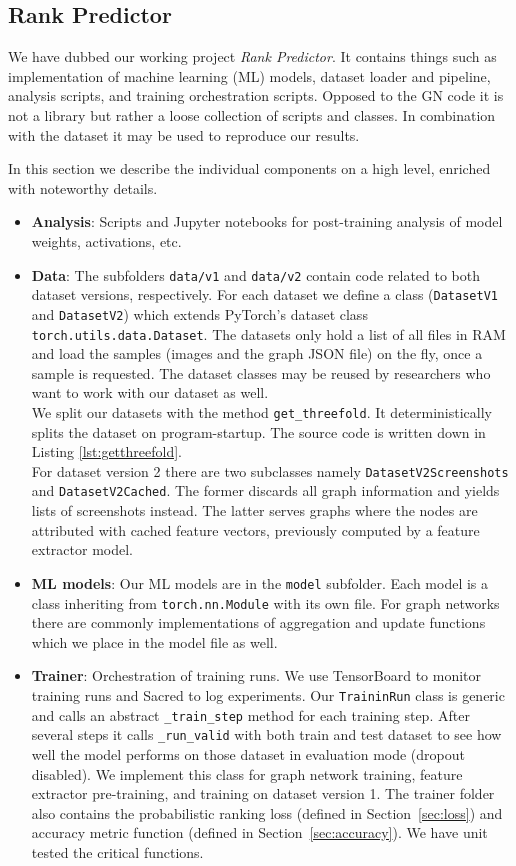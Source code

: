 \subsection{Rank Predictor}

We have dubbed our working project \textit{Rank Predictor}. It contains things such as implementation of machine learning (ML) models, dataset loader and pipeline, analysis scripts, and training orchestration scripts. Opposed to the GN code it is not a library but rather a loose collection of scripts and classes. In combination with the dataset it may be used to reproduce our results.

In this section we describe the individual components on a high level, enriched with noteworthy details.

\begin{itemize}
    \item \textbf{Analysis}: Scripts and Jupyter notebooks for post-training analysis of model weights, activations, etc.
    \item \textbf{Data}: The subfolders \texttt{data/v1} and \texttt{data/v2} contain code related to both dataset versions, respectively. For each dataset we define a class (\texttt{DatasetV1} and \texttt{DatasetV2}) which extends PyTorch's dataset class \texttt{torch.utils.data.Dataset}. The datasets only hold a list of all files in RAM and load the samples (images and the graph JSON file) on the fly, once a sample is requested. The dataset classes may be reused by researchers who want to work with our dataset as well.\\
    We split our datasets with the method \texttt{get\_threefold}. It deterministically splits the dataset on program-startup. The source code is written down in Listing \ref{lst:getthreefold}.\\
    For dataset version 2 there are two subclasses namely \texttt{DatasetV2Screenshots} and \texttt{DatasetV2Cached}. The former discards all graph information and yields lists of screenshots instead. The latter serves graphs where the nodes are attributed with cached feature vectors, previously computed by a feature extractor model.
    \item \textbf{ML models}: Our ML models are in the \texttt{model} subfolder. Each model is a class inheriting from \texttt{torch.nn.Module} with its own file. For graph networks there are commonly implementations of aggregation and update functions which we place in the model file as well.
    \item \textbf{Trainer}: Orchestration of training runs. We use TensorBoard to monitor training runs and Sacred to log experiments. Our \texttt{TraininRun} class is generic and calls an abstract \texttt{\_train\_step} method for each training step. After several steps it calls \texttt{\_run\_valid} with both train and test dataset to see how well the model performs on those dataset in evaluation mode (dropout disabled). We implement this class for graph network training, feature extractor pre-training, and training on dataset version 1. The trainer folder also contains the probabilistic ranking loss (defined in Section~\ref{sec:loss}) and accuracy metric function (defined in Section~\ref{sec:accuracy}). We have unit tested the critical functions.
\end{itemize}
